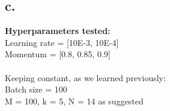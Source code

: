 \documentclass{article}
\newcommand{\1}{\mathbf{1}}
\begin{document}
{\subsection*{c.}

\textbf{Hyperparameters tested:} \\
Learning rate = [10E-3, 10E-4] \\
Momentum = [0.8, 0.85, 0.9] \\ \\ 
Keeping constant, as we learned previously: \\
Batch size = 100 \\
M = 100, k = 5, N = 14 as suggested \\

\begin{figure}[h]
  \centering
\end{figure}

}
\end{document}
